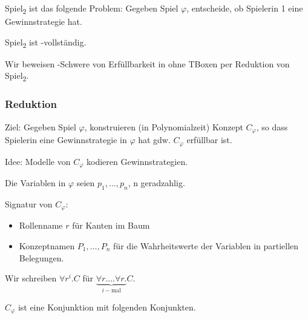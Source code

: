 \begin{definition}
    Spiel\textsubscript{2} ist das folgende Problem: Gegeben Spiel $\varphi$, entscheide, ob Spielerin 1 eine Gewinnstrategie hat.
\end{definition}

\begin{theorem}[Schaefer 1978]
    Spiel\textsubscript{2} ist \PSpace-vollständig.
\end{theorem}

Wir beweisen \PSpace-Schwere von Erfüllbarkeit in \ALC ohne TBoxen per Reduktion von Spiel\textsubscript{2}.

\subsubsection{Reduktion}

Ziel: Gegeben Spiel $\varphi$, konstruieren (in Polynomialzeit) Konzept $C_\varphi$, so dass Spielerin eine Gewinnstrategie in $\varphi$ hat gdw. $C_\varphi$ erfüllbar ist.

Idee: Modelle von $C_\varphi$ kodieren Gewinnstrategien.

Die Variablen in $\varphi$ seien $p_1, \ldots, p_n$, n geradzahlig.

Signatur von $C_\varphi$:
\begin{itemize}
    \item Rollenname $r$ für Kanten im Baum
    \item Konzeptnamen $P_1, \ldots, P_n$ für die Wahrheitswerte der Variablen in partiellen Belegungen.
\end{itemize}
Wir schreiben $\forall r^i.C$ für $\underbrace{\forall r.\ldots\forall r.}_{i-\text{mal}}C$.

$C_\varphi$ ist eine Konjunktion mit folgenden Konjunkten.

